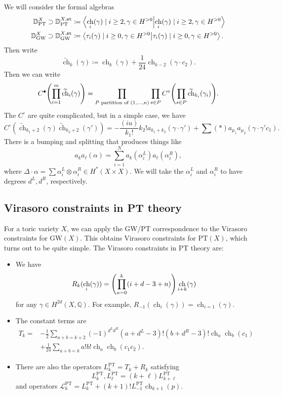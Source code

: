 \documentclass[leqno, openany]{memoir}
\theoremstyle{definition}
\theoremstyle{remark}
\theoremstyle{plain}
\theoremstyle{definition}
\theoremstyle{remark}
\newcommand{\Q}{\mathbb{Q}}
\newcommand{\mc}[1]{\mathcal{#1}}
\newcommand{\mr}[1]{\mathrm{#1}}
\newcommand{\mt}[1]{\mathtt{#1}}
\newcommand{\wt}[1]{\widetilde{#1}}
\DeclareMathOperator{\ch}{ch}
\begin{document}
We will consider the formal algebras
\begin{align*}
    \mathbb{D}_{\mr{PT}}^X &\supset \mathbb{D}_{\mr{PT}}^{ X, \mt{st} } \coloneqq \braket{\ch_i(\gamma) \mid i \geq 2, \gamma \in H^{>0}} \\
    \mathbb{D}_{\mr{GW}}^X &\supset \mathbb{D}_{\mr{GW}}^{ X, \mt{st} } \coloneqq \braket{\tau_i(\gamma) \mid i \geq 0, \gamma \in H^{>0}}.
\end{align*}
Then write
\[ \wt{\ch}_k(\gamma) \coloneqq \ch_k(\gamma) + \frac{1}{24} \ch_{k-2}(\gamma \cdot c_2). \]
Then we can write
\[ C^{\bullet}\qty(\prod_{i=1}^m \wt{\ch}_i(\gamma)) = \prod_{P \text{ partition of } (1, \ldots, n)} \prod_{s \in P} C^{\circ} \qty(\prod_{s \in P} \wt{\ch}_{{k_i}}(\gamma_i)). \]
The $C^{\circ}$ are quite complicated, but in a simple case, we have
\[ C^{\circ}(\wt{\ch}_{k_1+2}(\gamma) \wt{\ch}_{k_2 + 2}(\gamma')) = -\frac{(iu)}{k_1!}{k_2!} a_{k_1+k_2}(\gamma \cdot \gamma') + \sum (*) a_{\mu_1} a_{\mu_2}(\gamma \cdot \gamma' c_1). \]
There is a bumping and splitting that produces things like
\[ a_k a_{\ell}(\alpha) = \sum_{i=1}^N a_k(\alpha_i^L) a_{\ell}(\alpha_i^R), \]
where $\Delta \cdot \alpha = \sum \alpha_i^L \otimes \alpha_i^R \in H^*(X \times X)$. We will take the $\alpha_i^L$ and $\alpha_i^R$ to have degrees $d^L, d^R$, respectively.

\subsection{Virasoro constraints in PT theory}

For a toric variety $X$, we can apply the GW/PT correspondence to the Virasoro constraints for $\mr{GW}(X)$. This obtains Virasoro constraints for $\mr{PT}(X)$, which turns out to be quite simple. The Virasoro constraints in PT theory are:
\begin{itemize}
    \item We have
        \[ R_k(\ch_i(\gamma)) = \qty(\prod_{n=0}^k (i+d-3+n)) \ch_{i+k}(\gamma) \]
        for any $\gamma \in H^{2d}(X, \Q)$. For example, $R_{-1}(\ch_i(\gamma)) = \ch_{i=1}(\gamma)$.
    \item The constant terms are
        \begin{align*} 
            T_k ={}& -\frac{1}{2} \sum_{a+b=k+2} (-1)^{d^L d^R}(a+d^L-3)!(b+d^R-3)! \ch_a \ch_b(c_1) \\ 
            &+ \frac{1}{24} \sum_{a+b=k} a! b! \ch_a \ch_b(c_1 c_2). 
        \end{align*}
    \item There are also the operators $L_k^{\mr{PT}} = T_k + R_k$ satisfying
        \[ L_k^{\mr{PT}}, L_{\ell}^{\mr{PT}} = (k+\ell) L_{k+\ell}^{\mr{PT}} \]
        and operators $\mc{L}_k^{\mr{PT}} = L_k^{\mr{PT}} + (k+1)! L_{-1}^{\mr{PT}} \ch_{k+1}(p)$.
\end{itemize}
\end{document}
